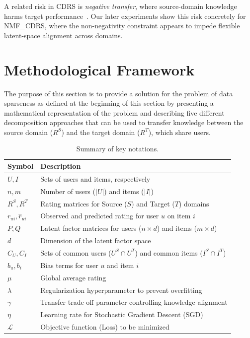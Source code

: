 \documentclass[pdflatex,sn-mathphys-num]{sn-jnl}%
\theoremstyle{thmstyleone}%
\theoremstyle{thmstyletwo}%
\theoremstyle{thmstylethree}%
\begin{document}
A related risk in CDRS is \emph{negative transfer}, where source-domain knowledge harms target performance~\cite{zhang2021transferability,wang2019characterizing}. Our later experiments show this risk concretely for NMF\_CDRS, where the non-negativity constraint appears to impede flexible latent-space alignment across domains.

\section{Methodological Framework}
The purpose of this section is to provide a solution for the problem of data sparseness as defined at the beginning of this section by presenting a mathematical representation of the problem and describing five different decomposition approaches that can be used to transfer knowledge between the source domain ($R^S$) and the target domain ($R^T$), which share users.

\begin{table}[!htbp]
\centering
\caption{Summary of key notations.}
\label{tab:notations}
\renewcommand{\arraystretch}{1.2}
\begin{tabular}{l p{10cm}}
\toprule
\textbf{Symbol} & \textbf{Description} \\
\midrule
$U, I$ & Sets of users and items, respectively \\
$n, m$ & Number of users ($|U|$) and items ($|I|$) \\
$R^S, R^T$ & Rating matrices for Source ($S$) and Target ($T$) domains \\
$r_{ui}, \hat{r}_{ui}$ & Observed and predicted rating for user $u$ on item $i$ \\
$P, Q$ & Latent factor matrices for users ($n \times d$) and items ($m \times d$) \\
$d$ & Dimension of the latent factor space \\
$C_U, C_I$ & Sets of common users ($U^S \cap U^T$) and common items ($I^S \cap I^T$) \\
$b_u, b_i$ & Bias terms for user $u$ and item $i$ \\
$\mu$ & Global average rating \\
$\lambda$ & Regularization hyperparameter to prevent overfitting \\
$\gamma$ & Transfer trade-off parameter controlling knowledge alignment \\
$\eta$ & Learning rate for Stochastic Gradient Descent (SGD) \\
$\mathcal{L}$ & Objective function (Loss) to be minimized \\
\bottomrule
\end{tabular}
\end{table}
\end{document}
